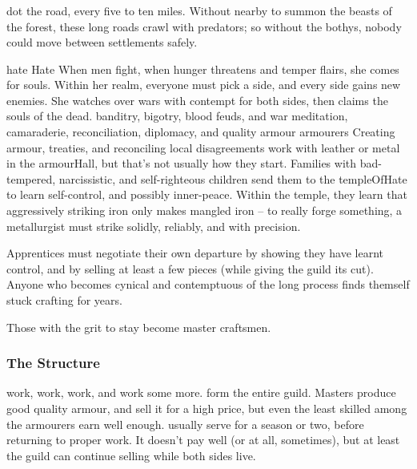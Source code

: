 \begin{multicols}{2}

\subsubsection{}
dot the road, every five to ten miles.
Without  nearby to summon the beasts of the forest, these long roads crawl with predators; so without the \glspl{bothy}, nobody could move between settlements safely.

  {\gls{hate}}%
  {Hate}%
  {When men fight, when hunger threatens and temper flairs, she comes for souls.
  Within her realm, everyone must pick a side, and every side gains new enemies.
  She watches over wars with contempt for both sides, then claims the souls of the dead.}%
  {banditry, bigotry, blood feuds, and war}%
  {meditation, camaraderie, reconciliation, diplomacy, and quality armour}%
  {\Glspl{armourer}}%
  {Creating armour, treaties, and reconciling local disagreements}%
work with leather or metal in the \gls{armourHall}, but that's not usually how they start.
Families with bad-tempered, narcissistic, and self-righteous children send them to the \gls{templeOfHate} to learn self-control, and possibly inner-peace.
Within the temple, they learn that aggressively striking iron only makes mangled iron -- to really forge something, a metallurgist must strike solidly, reliably, and with precision.

Apprentices must negotiate their own departure by showing they have learnt control, and by selling at least a few pieces (while giving the guild its cut).
Anyone who becomes cynical and contemptuous of the long process finds themself stuck crafting for years.

Those with the grit to stay become master craftsmen.

\subsubsection{The Structure}

\begin{description}
  work, work, work, and work some more.
  form the entire guild.
  Masters produce good quality armour, and sell it for a high price, but even the least skilled among the armourers earn well enough.
  usually serve for a season or two, before returning to proper work.
  It doesn't pay well (or at all, sometimes), but at least the guild can continue selling while both sides live.


\end{description}
\end{multicols}
